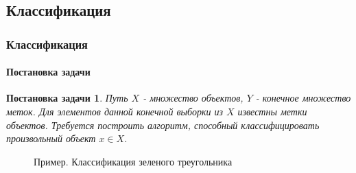 \documentclass[xcolor=table]{beamer}
\newtheorem{prob}{Постановка задачи}
\begin{document}
\subsection{Классификация}
\begin{frame}
  \frametitle{Классификация}
  \framesubtitle{Постановка задачи}
  
  \begin{prob}
    Путь $X$ - множество объектов, $Y$ - конечное множество меток.
    Для элементов данной конечной выборки из $X$ известны метки объектов. Требуется построить алгоритм,
    способный классифицировать произвольный объект $x \in X$.
  \end{prob}

  \vspace{-15pt}

  \begin{center}
    \begin{figure}
      \caption{Пример. Классификация зеленого треугольника}
      \vspace{-5pt}
    \end{figure}
  \end{center}
\end{frame}
\end{document}

